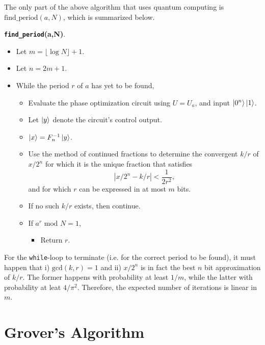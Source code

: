 \documentclass [12pt]{article}
\theoremstyle{definition}
\begin{document}
\newpage
The only part of the above algorithm that uses quantum computing is $\mbox{find\_period}(a,N)$, which is summarized below.


\textbf{\texttt{find\_period}(a,N)}.

\begin{itemize}
\renewcommand{\labelitemi}{}
\renewcommand{\labelitemii}{}
\renewcommand{\labelitemiii}{}

\item Let $m = \lfloor\log N\rfloor + 1$.
\item Let $n=2m+1$.
\item While the period $r$ of $a$ has yet to be found,


\begin{itemize}

\item Evaluate the phase optimization circuit using $U=U_a$, and input $\ket{0^n}\ket{1}$.
\item Let $\ket{y}$ denote the circuit's control output.
\item $\ket{x} = F_n^{-1}\ket{y}$.
\item Use the method of continued fractions to determine the convergent $k/r$ of $x/2^n$  for which
it is the unique fraction that satisfies
\[|x/2^n-k/r|  < \frac{1}{2r^2},\]
and for which $r$ can be expressed in at most $m$ bits. 

\item If no such $k/r$ exists, then continue.


\item If $a^r \mbox{ mod } N = 1$,

\begin{itemize}

\item Return $r$.

\end{itemize}


\end{itemize}


\end{itemize}

For the \texttt{while}-loop to terminate (i.e. for the correct period to be found), it must happen that i) $\mbox{gcd}(k,r)=1$ and ii) $x/2^n$ is in fact the best $n$ bit approximation 
of $k/r$. The former happens with probability at least $1/m$, while the latter with probability at leat $4/\pi^2$. Therefore, the expected number of iterations is linear in $m$.


\newpage
\section*{Grover's Algorithm} 
\end{document}
